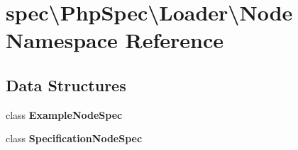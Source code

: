 \section{spec\textbackslash{}Php\+Spec\textbackslash{}Loader\textbackslash{}Node Namespace Reference}
\label{namespacespec_1_1_php_spec_1_1_loader_1_1_node}
\subsection*{Data Structures}
\begin{DoxyCompactItemize}
\item 
class {\bf Example\+Node\+Spec}
\item 
class {\bf Specification\+Node\+Spec}
\end{DoxyCompactItemize}
